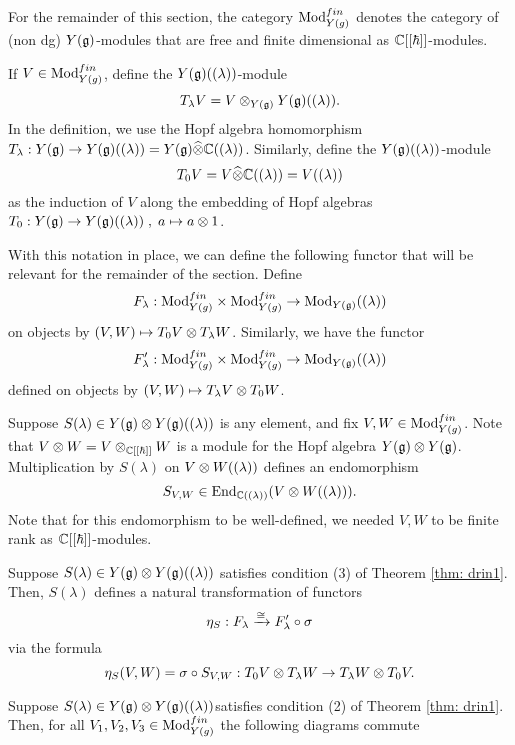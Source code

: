 \documentclass[11pt]{amsart}
\begin{document}
For the remainder of this section, the category ${\rm Mod}_{Y(g)}^{fin}$ denotes the category of (non dg) $Y(\mathfrak g)$-modules that are free and finite dimensional as $\mathbb C[[\hbar]]$-modules. 

\begin{dfn}
If $V \in {\rm Mod}_{Y(g)}^{fin}$, define the $Y(\mathfrak g)((\lambda))$-module
\[
T_\lambda V = V \otimes_{Y(\mathfrak g)} Y(\mathfrak g)((\lambda)) .
\]
In the definition, we use the Hopf algebra homomorphism $T_\lambda : Y(\mathfrak g) \to Y(\mathfrak g)((\lambda)) = Y(\mathfrak g) \widehat{\otimes} \mathbb C((\lambda))$. 
Similarly, define the $Y(\mathfrak g)((\lambda))$-module
\[
T_0 V = V \widehat{\otimes} \mathbb C((\lambda)) = V((\lambda))
\]
as the induction of $V$ along the embedding of Hopf algebras $T_0 : Y(\mathfrak g) \to Y(\mathfrak g)((\lambda)) \;, \; a \mapsto a \otimes 1$. 
\end{dfn}

With this notation in place, we can define the following functor that will be relevant for the remainder of the section. 
Define
\begin{equation}\label{functor}
F_\lambda : {\rm Mod}_{Y(g)}^{fin} \times {\rm Mod}_{Y(g)}^{fin} \to {\rm Mod}_{Y(\mathfrak g)}((\lambda))
\end{equation}
on objects by $(V, W) \mapsto T_0 V \otimes T_\lambda W$.
Similarly, we have the functor
\[
F'_\lambda : {\rm Mod}_{Y(g)}^{fin} \times {\rm Mod}_{Y(g)}^{fin} \to {\rm Mod}_{Y(\mathfrak g)}((\lambda))
\]
defined on objects by $(V, W) \mapsto T_\lambda V \otimes T_0 W$.

\begin{con}
Suppose $S(\lambda) \in Y(\mathfrak g) \otimes Y(\mathfrak g)((\lambda))$ is any element,
and fix $V, W \in {\rm Mod}_{Y(g)}^{fin}$. 
Note that $V \otimes W = V \otimes_{\mathbb C[[\hbar]]} W$ is a module for the Hopf algebra $Y(\mathfrak g) \otimes Y(\mathfrak g)$. 
Multiplication by $S(\lambda)$ on $V \otimes W ((\lambda))$ defines an endomorphism
\[
S_{V,W} \in {\rm End}_{\mathbb C((\lambda))} (V \otimes W((\lambda))) .
\]
Note that for this endomorphism to be well-defined, we needed $V,W$ to be finite rank as $\mathbb C[[\hbar]]$-modules.
\end{con}

\begin{lem}\label{lem: R1}
Suppose $S(\lambda) \in Y(\mathfrak g) \otimes Y(\mathfrak g)((\lambda))$ satisfies condition (3) of Theorem \ref{thm: drin1}. 
Then, $S(\lambda)$ defines a natural transformation of functors
\[
\eta_{S} : F_\lambda \xrightarrow{\cong} F'_\lambda \circ \sigma
\]
via the formula
\[
\eta_S (V,W) = \sigma \circ S_{V,W} : T_0 V \otimes T_\lambda W \to T_\lambda W \otimes T_0 V.
\]
\end{lem}

\begin{lem}
Suppose $S(\lambda) \in Y(\mathfrak g) \otimes Y(\mathfrak g)((\lambda))$satisfies condition (2) of Theorem \ref{thm: drin1}. 
Then, for all $V_1,V_2,V_3 \in {\rm Mod}_{Y(g)}^{fin}$ the following diagrams commute 
\end{lem}
\end{document}
